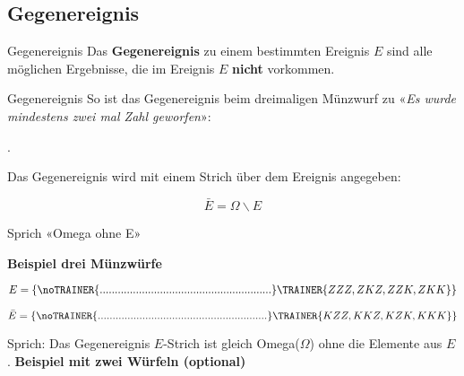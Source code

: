\subsection{Gegenereignis}

\begin{definition}{Gegenereignis}{}
  Das \textbf{Gegenereignis} zu einem bestimmten Ereignis $E$ sind alle möglichen Ergebnisse,
  die im Ereignis $E$ \textbf{nicht} vorkommen.
\end{definition}

\begin{beispiel}{Gegenereignis}{}
So ist das Gegenereignis beim dreimaligen Münzwurf zu «\textit{Es wurde mindestens zwei mal Zahl
geworfen}»: 

\vspace{3mm}
.
\end{beispiel}

\vspace{2mm}


\begin{definition}{}{}
Das Gegenereignis wird mit einem Strich über dem Ereignis angegeben:

$$\bar{E} = \Omega \backslash E$$

Sprich «Omega ohne E»
\end{definition}

\newpage
\textbf{Beispiel drei Münzwürfe}


$$E = \{
\noTRAINER{.........................................................}\TRAINER{ZZZ,
ZKZ, ZZK, ZKK\}}$$

$$\bar{E} = \{
\noTRAINER{.........................................................}\TRAINER{KZZ,
KKZ, KZK, KKK\}}$$


Sprich: Das Gegenereignis $E$-Strich ist gleich Omega($\Omega$) ohne die Elemente
aus $E$.
\newpage
\textbf{Beispiel mit zwei Würfeln (optional)}



